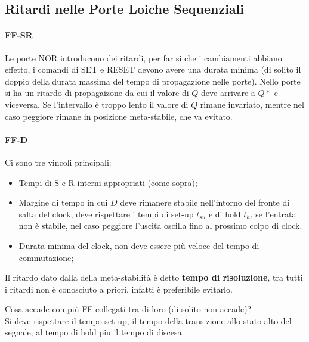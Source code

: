 \documentclass[12pt]{article}
\begin{document}
\subsection{Ritardi nelle Porte Loiche Sequenziali}
\paragraph{FF-SR}
Le porte NOR introducono dei ritardi, per far si che i cambiamenti abbiano effetto, i comandi di SET e RESET devono avere una durata minima (di solito il doppio della durata massima del tempo di propagazione nelle porte). Nello porte si ha un ritardo di propagaizone da cui il valore di $Q$ deve arrivare a $Q*$ e viceversa. Se l'intervallo \`e troppo lento il valore di $Q$ rimane invariato, mentre nel caso peggiore rimane in posizione meta-stabile, che va evitato.

\paragraph{FF-D}
Ci sono tre vincoli principali:
\begin{itemize}
    \item Tempi di S e R interni appropriati (come sopra);
    \item Margine di tempo  in cui $D$ deve rimanere stabile nell'intorno del fronte di salta del clock, deve rispettare i tempi di set-up $t_{su}$ e di hold $t_h$, se l'entrata non \`e stabile, nel caso peggiore l'uscita oscilla fino al prossimo colpo di clock.
    \item Durata minima del clock, non deve essere pi\`u veloce del tempo di commutazione;
\end{itemize}

Il ritardo dato dalla della meta-stabilit\`a \`e detto \textbf{tempo di risoluzione}, tra tutti i ritardi non \`e conosciuto a priori, infatti \`e preferibile evitarlo.

Cosa accade con pi\`u FF collegati tra di loro (di solito non accade)? \\
Si deve rispettare il tempo set-up, il tempo della transizione allo stato alto  del segnale, al tempo di hold piu il tempo di discesa.
\end{document}
